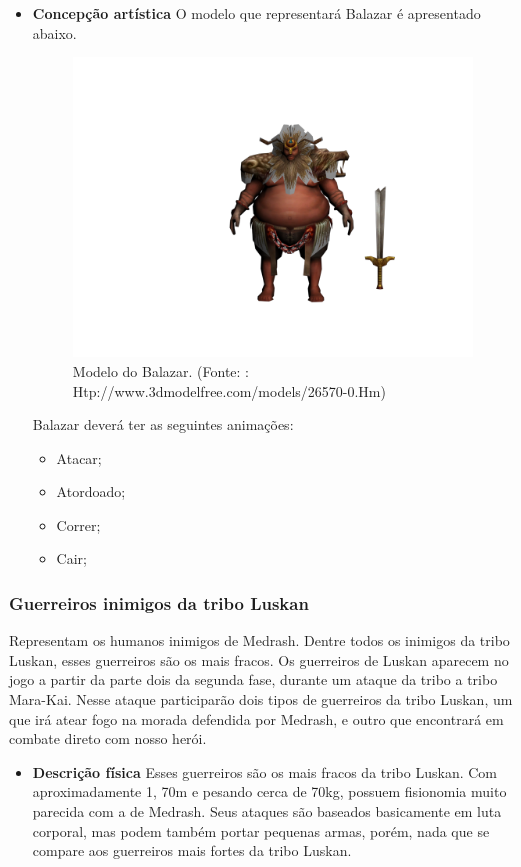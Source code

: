 \begin{itemize}
\item{\bf Concepção artística} O modelo que representará Balazar é apresentado abaixo.
 \begin{figure}[H]
 \centering
 \includegraphics[scale=0.33]{Imagens/inimigo01.png}
 \caption{Modelo do Balazar. (Fonte: : Htp://www.3dmodelfree.com/models/26570-0.Hm)}
\label{img:balazar}
\end{figure}

Balazar deverá ter as seguintes animações: 
\begin{itemize}
\item {Atacar;}
\item {Atordoado;}
\item {Correr;}
\item {Cair;}
\end{itemize}
\end{itemize}
\subsubsection{Guerreiros inimigos da tribo Luskan}
Representam os humanos inimigos de Medrash. Dentre todos os inimigos da tribo Luskan, esses guerreiros são os mais fracos. Os guerreiros de Luskan aparecem no jogo a partir da parte dois da segunda fase, durante um ataque da tribo a tribo Mara-Kai. Nesse ataque participarão dois tipos de guerreiros da tribo Luskan, um que irá atear fogo na morada defendida por Medrash, e outro que encontrará em combate direto com nosso herói.

\begin{itemize}
\item{\bf Descrição física}
Esses guerreiros são os mais fracos da tribo Luskan. Com aproximadamente 1, 70m e pesando cerca de 70kg, possuem fisionomia muito parecida com a de Medrash. Seus ataques são baseados basicamente em luta corporal, mas podem também portar pequenas armas, porém, nada que se compare aos guerreiros mais fortes da tribo Luskan.
\end{itemize}

